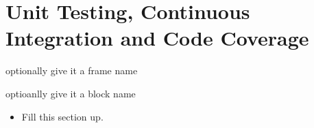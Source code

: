 \section{Unit Testing, Continuous Integration and Code Coverage}
\begin{frame}{optionally give it a frame name}
\begin{block}{optioanlly give it a block name}
\begin{itemize}
\item Fill this section up.
\end{itemize}
\end{block}
\end{frame}
